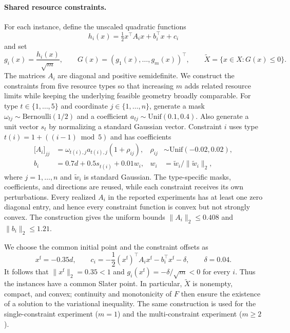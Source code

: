 \paragraph{Shared resource constraints.}
For each instance, define the unscaled quadratic functions
\[
h_i(x)=\tfrac12x^\top A_i x+b_i^\top x+c_i
\]
and set
\begin{equation}\label{eq:numerical_quadratic_constraints}
g_i(x)=\frac{h_i(x)}{\sqrt m},\qquad
G(x)=(g_1(x),\ldots,g_m(x))^\top,\qquad
\widetilde X=\{x\in X:G(x)\le0\}.
\end{equation}
The matrices $A_i$ are diagonal and positive semidefinite. We construct
the constraints from five resource types so that increasing $m$ adds
related resource limits while keeping the underlying feasible geometry
broadly comparable. For type $t\in\{1,\ldots,5\}$ and coordinate
$j\in\{1,\ldots,n\}$, generate a mask
$\omega_{tj}\sim\mathrm{Bernoulli}(1/2)$ and a coefficient
$a_{tj}\sim\mathrm{Unif}(0.1,0.4)$. Also generate a unit vector $s_t$ by
normalizing a standard Gaussian vector. Constraint $i$ uses type
$t(i)=1+((i-1)\bmod 5)$ and has coefficients
\begin{equation}\label{eq:numerical_resource_coefficients}
\begin{aligned}
\bigl[A_i\bigr]_{jj}&=\omega_{t(i),j}a_{t(i),j}(1+\rho_{ij}),
&\rho_{ij}&\sim\mathrm{Unif}(-0.02,0.02),\\
b_i&=0.7d+0.5s_{t(i)}+0.01w_i,
&w_i&=\widetilde w_i/\|\widetilde w_i\|_2,
\end{aligned}
\end{equation}
where $j=1,\ldots,n$ and $\widetilde w_i$ is standard Gaussian. The type-specific masks,
coefficients, and directions are reused, while each constraint receives
its own perturbations. Every realized $A_i$ in the reported experiments
has at least one zero diagonal entry, and hence every constraint function
is convex but not strongly convex. The construction gives the uniform
bounds $\|A_i\|_2\le0.408$ and $\|b_i\|_2\le1.21$.

We choose the common initial point and the constraint offsets as
\begin{equation}\label{eq:numerical_slater_point}
x^{\mathrm f}=-0.35d,\qquad
c_i=-\frac12(x^{\mathrm f})^\top A_i x^{\mathrm f}
-b_i^\top x^{\mathrm f}-\delta,\qquad \delta=0.04.
\end{equation}
It follows that $\|x^{\mathrm f}\|_2=0.35<1$ and
$g_i(x^{\mathrm f})=-\delta/\sqrt m<0$ for every $i$. Thus the instances
have a common Slater point. In particular, $\widetilde X$ is nonempty,
compact, and convex; continuity and monotonicity of $F$ then ensure the
existence of a solution to the variational inequality. The same
construction is used for the single-constraint experiment ($m=1$) and the
multi-constraint experiment ($m\ge2$).

